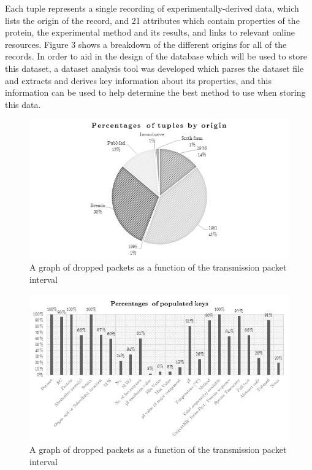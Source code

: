\documentclass[12pt,a4paper]{article}
\begin{document}
Each tuple represents a single recording of experimentally-derived data, which
lists the origin of the record, and 21 attributes which contain properties of
the protein, the experimental method and its results, and links to relevant
online resources. Figure 3 shows a breakdown of the different origins for all of
the records. In order to aid in the design of the database which will be used to
store this dataset, a dataset analysis tool was developed which parses the
dataset file and extracts and derives key information about its properties, and
this information can be used to help determine the best method to use when
storing this data.

\begin{figure}[H]
\centering
\includegraphics{assets/chart-dataset-origin.png}
\caption{A graph of dropped packets as a function of the transmission packet
  interval}
\label{fig:graph-interval-dropped}
\end{figure}

\newpage
\begin{figure}[H]
\centering
\includegraphics{assets/chart-dataset-populated.png}
\caption{A graph of dropped packets as a function of the transmission packet
  interval}
\label{fig:graph-interval-dropped}
\end{figure}
\end{document}
